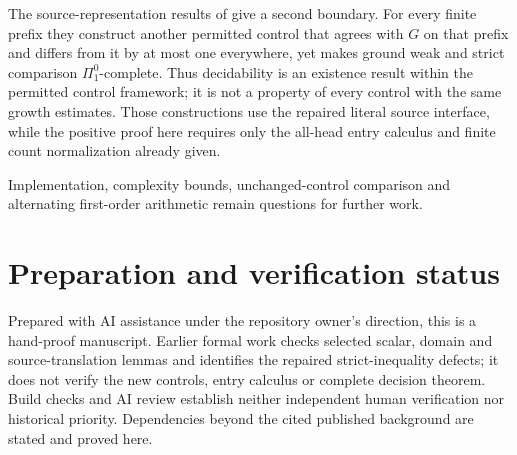 \documentclass[11pt,a4paper]{article}
\numberwithin{equation}{section}
\theoremstyle{definition}
\theoremstyle{remark}
\begin{document}
The source-representation results of \cite{sourceexpressivity} give a
second boundary. For every finite prefix they construct another permitted
control that agrees with \(G\) on that prefix and differs from it by at
most one everywhere, yet makes ground weak and strict comparison
\(\Pi^0_1\)-complete. Thus decidability is an existence result within
the permitted control framework; it is not a property of every control
with the same growth estimates. Those constructions use the repaired
literal source interface, while the positive proof here requires only
the all-head entry calculus and finite count normalization already given.

Implementation, complexity bounds, unchanged-control comparison and
alternating first-order arithmetic remain questions for further work.

\section*{Preparation and verification status}

Prepared with AI assistance under the repository owner's direction, this
is a hand-proof manuscript. Earlier formal work checks selected scalar,
domain and source-translation lemmas and identifies the repaired
strict-inequality defects; it does not verify the new controls, entry
calculus or complete decision theorem. Build checks and AI review establish
neither independent human verification nor historical priority. Dependencies
beyond the cited published background are stated and proved here.


\end{document}
